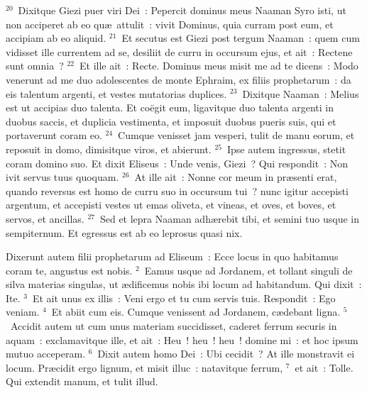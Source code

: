 ${}^{20}$~Dixitque Giezi puer viri Dei~: Pepercit dominus meus Naaman Syro isti, ut non acciperet ab eo qu\ae\ attulit~: vivit Dominus, quia curram post eum, et accipiam ab eo aliquid.
${}^{21}$~Et secutus est Giezi post tergum Naaman~: quem cum vidisset ille currentem ad se, desiliit de curru in occursum ejus, et ait~: Rectene sunt omnia~?
${}^{22}$~Et ille ait~: Recte. Dominus meus misit me ad te dicens~: Modo venerunt ad me duo adolescentes de monte Ephraim, ex filiis prophetarum~: da eis talentum argenti, et vestes mutatorias duplices.
${}^{23}$~Dixitque Naaman~: Melius est ut accipias duo talenta. Et co\"egit eum, ligavitque duo talenta argenti in duobus saccis, et duplicia vestimenta, et imposuit duobus pueris suis, qui et portaverunt coram eo.
${}^{24}$~Cumque venisset jam vesperi, tulit de manu eorum, et reposuit in domo, dimisitque viros, et abierunt.
${}^{25}$~Ipse autem ingressus, stetit coram domino suo. Et dixit Eliseus~: Unde venis, Giezi~? Qui respondit~: Non ivit servus tuus quoquam.
${}^{26}$~At ille ait~: Nonne cor meum in pr\ae senti erat, quando reversus est homo de curru suo in occursum tui~? nunc igitur accepisti argentum, et accepisti vestes ut emas oliveta, et vineas, et oves, et boves, et servos, et ancillas.
${}^{27}$~Sed et lepra Naaman adh\ae rebit tibi, et semini tuo usque in sempiternum. Et egressus est ab eo leprosus quasi nix.

\bchapter
\lettrine[lines=3,image=true,loversize=0.05,lraise=-0.03]{D}{}ixerunt autem filii prophetarum ad Eliseum~: Ecce locus in quo habitamus coram te, angustus est nobis.
${}^{2}$~Eamus usque ad Jordanem, et tollant singuli de silva materias singulas, ut \ae dificemus nobis ibi locum ad habitandum. Qui dixit~: Ite.
${}^{3}$~Et ait unus ex illis~: Veni ergo et tu cum servis tuis. Respondit~: Ego veniam.
${}^{4}$~Et abiit cum eis. Cumque venissent ad Jordanem, c\ae debant ligna.
${}^{5}$~Accidit autem ut cum unus materiam succidisset, caderet ferrum securis in aquam~: exclamavitque ille, et ait~: Heu~! heu~! heu~! domine mi~: et hoc ipsum mutuo acceperam.
${}^{6}$~Dixit autem homo Dei~: Ubi cecidit~? At ille monstravit ei locum. Pr\ae cidit ergo lignum, et misit illuc~: natavitque ferrum,
${}^{7}$~et ait~: Tolle. Qui extendit manum, et tulit illud.


